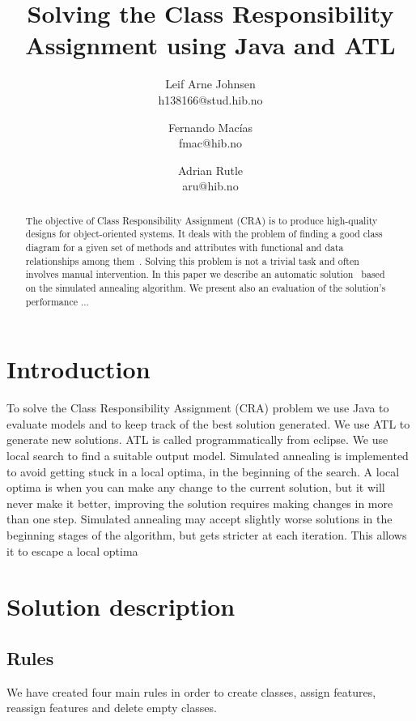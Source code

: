 \documentclass[a4paper]{article}
\title{Solving the Class Responsibility Assignment using Java and ATL}
\author{
Leif Arne Johnsen \\ h138166@stud.hib.no
\and
Fernando Macías \\ fmac@hib.no
\and
Adrian Rutle \\ aru@hib.no
}
\begin{document}
\maketitle

\begin{abstract}
The objective of Class Responsibility Assignment (CRA) is to produce high-quality designs for object-oriented systems. 
It deals with the problem of finding a good class diagram for a given set of methods and attributes with functional and data
relationships among them~\cite{BowmanBL10}.
Solving this problem is not a trivial task and often involves manual intervention.
In this paper we describe an automatic solution~\cite{XPTUeJavaAtlvdi} based on the simulated annealing algorithm.
We present also an evaluation of the solution's performance ... 

\end{abstract}


\section{Introduction}

To solve the Class Responsibility Assignment (CRA) problem we use Java to evaluate models and to keep track of
the best solution generated.
We use ATL to generate new solutions. ATL is called
programmatically from eclipse.
We use local search to find a suitable output
model.
Simulated annealing is implemented to avoid getting stuck in a local
optima, in the beginning of the search.
A local optima is when you can make
any change to the current solution, but it will never make it better, improving
the solution requires making changes in more than one step.
Simulated
annealing may accept slightly worse solutions in the beginning stages of the
algorithm, but gets stricter at each iteration.
This allows it to escape a local
optima

\section{Solution description}

\subsection{Rules}

We have created four main rules in order to create classes, assign features, reassign features and delete empty classes.
\end{document}
